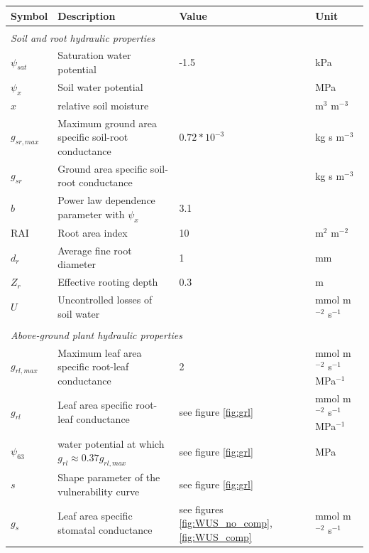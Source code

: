 \documentclass[utf8]{frontiersSCNS} %
\begin{document}
\begin{table}[h]
    \centering
    \begin{tabular}{l l l l}
        Symbol & Description & Value & Unit \\
        \hline
        \multicolumn{4}{l}{}\\
        \multicolumn{4}{l}{\textit{Soil and root hydraulic properties}}\\
        \hline
        $\psi_{sat}$ & Saturation water potential & -1.5 & kPa\\
        $\psi_x$ & Soil water potential & & MPa\\
        $x$ & relative soil moisture & & m$^{3}$ m$^{-3}$\\
        $g_{sr,max}$ & Maximum ground area specific soil-root conductance & $0.72 * 10^{-3}$ & kg s m$^{-3}$ \\
        $g_{sr}$ & Ground area specific soil-root conductance & & kg s m$^{-3}$\\
        $b$ & Power law dependence parameter with $\psi_x$ & 3.1 & \\
        RAI & Root area index & 10 & m$^{2}$ m$^{-2}$\\
        $d_r$ & Average fine root diameter & 1 & mm \\
        $Z_r$ & Effective rooting depth & 0.3 & m\\ 
        $U$ & Uncontrolled losses of soil water & & mmol m$^{-2}$ s$^{-1}$\\
        \hline
        \multicolumn{4}{l}{}\\
        \multicolumn{4}{l}{\textit{Above-ground plant hydraulic properties}}\\
        \hline
        $g_{rl,max}$ & Maximum leaf area specific root-leaf conductance & 2 & mmol m$^{-2}$ s$^{-1}$ MPa$^{-1}$ \\
        $g_{rl}$ & Leaf area specific root-leaf conductance & see figure \ref{fig:grl} & mmol m$^{-2}$ s$^{-1}$ MPa$^{-1}$ \\
        $\psi_{63}$ & water potential at which $g_{rl} \approx 0.37 g_{rl,max}$ & see figure \ref{fig:grl} & MPa \\
        $s$ & Shape parameter of the vulnerability curve & see figure \ref{fig:grl} &  \\
        $g_s$ & Leaf area specific stomatal conductance & see figures \ref{fig:WUS_no_comp}, \ref{fig:WUS_comp} & mmol m$^{-2}$ s$^{-1}$ \\

\end{tabular}
\end{table}
\end{document}
